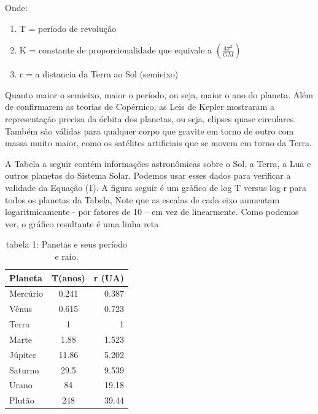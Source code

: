 \documentclass[a4paper]{article} %
\begin{document}
Onde:
\begin{enumerate}
	\item T = período de revolução
	\item K = constante de proporcionalidade que equivale a $\left(\frac{4\pi^2}{GM}\right)$
	\item r = a distancia da Terra ao Sol (semieixo)
\end{enumerate}

Quanto maior o semieixo, maior o período, ou seja, maior o ano do planeta.
Além de confirmarem as teorias de Copérnico, as Leis de Kepler mostraram a representação precisa da órbita dos planetas, ou seja, elipses quase circulares.
Também são válidas para qualquer corpo que gravite em torno de outro com massa muito maior, como os satélites artificiais que se movem em torno da Terra.

A Tabela a seguir contém informações astronômicas sobre o Sol, a Terra, a Lua e outros planetas do Sistema Solar. Podemos usar esses dados para verificar a validade da Equação (1). A figura seguir é um gráfico de log T versus log r para todos os planetas da Tabela, Note que as escalas de cada eixo aumentam logaritmicamente - por fatores de 10 – em vez de linearmente. Como podemos ver, o gráfico resultante é uma linha reta

\begin{table}
	\centering
	\begin{tabular}{l|c|r}
		Planeta & T(anos) & r (UA) \\\hline
		Mercúrio & 0.241 & 0.387 \\
		Vênus & 0.615  & 0.723\\
		Terra & 1 & 1\\
		Marte & 1.88 & 1.523\\
		Júpiter & 11.86 & 5.202\\
		Saturno & 29.5 & 9.539\\
		Urano & 84 & 19.18\\
		Plutão & 248 & 39.44
	\end{tabular}
	\caption{\label{tab:widgets}tabela 1: Panetas e seus período e raio.}
\end{table}
\end{document}
